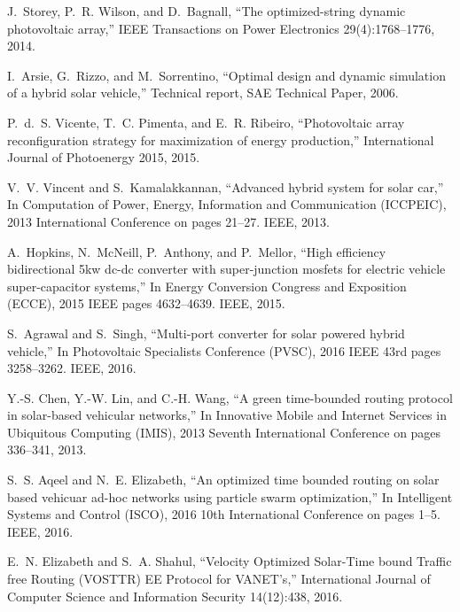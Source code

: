 J.~Storey, P.~R. Wilson, and D.~Bagnall,
\newblock ``The optimized-string dynamic photovoltaic array,''
\newblock IEEE Transactions on Power Electronics 29(4):1768--1776, 2014.
  
I.~Arsie, G.~Rizzo, and M.~Sorrentino,
\newblock ``Optimal design and dynamic simulation of a hybrid solar vehicle,''
\newblock Technical report, SAE Technical Paper, 2006.
  
P.~d.~S. Vicente, T.~C. Pimenta, and E.~R. Ribeiro,
\newblock ``Photovoltaic array reconfiguration strategy for maximization of
  energy production,''
\newblock International Journal of Photoenergy 2015, 2015.

V.~V. Vincent and S.~Kamalakkannan,
\newblock ``Advanced hybrid system for solar car,''
\newblock In Computation of Power, Energy, Information and Communication
  (ICCPEIC), 2013 International Conference on pages 21--27. IEEE, 2013.

A.~Hopkins, N.~McNeill, P.~Anthony, and P.~Mellor,
\newblock ``High efficiency bidirectional 5kw dc-dc converter with super-junction
  mosfets for electric vehicle super-capacitor systems,''
\newblock In Energy Conversion Congress and Exposition (ECCE), 2015 IEEE
  pages 4632--4639. IEEE, 2015.

S.~Agrawal and S.~Singh,
\newblock ``Multi-port converter for solar powered hybrid vehicle,''
\newblock In Photovoltaic Specialists Conference (PVSC), 2016 IEEE 43rd
  pages 3258--3262. IEEE, 2016.

Y.-S. Chen, Y.-W. Lin, and C.-H. Wang,
\newblock ``A green time-bounded routing protocol in solar-based vehicular networks,''
\newblock In Innovative Mobile and Internet Services in Ubiquitous
  Computing (IMIS), 2013 Seventh International Conference on pages 336--341, 2013.

S.~S. Aqeel and N.~E. Elizabeth,
\newblock ``An optimized time bounded routing on solar based vehicuar ad-hoc networks using particle swarm optimization,''
\newblock In Intelligent Systems and Control (ISCO), 2016 10th International Conference on pages 1--5. IEEE, 2016.

E.~N. Elizabeth and S.~A. Shahul,
\newblock ``Velocity Optimized Solar-Time bound Traffic free Routing (VOSTTR) EE Protocol for VANET's,''
\newblock International Journal of Computer Science and Information
  Security 14(12):438, 2016.
  
